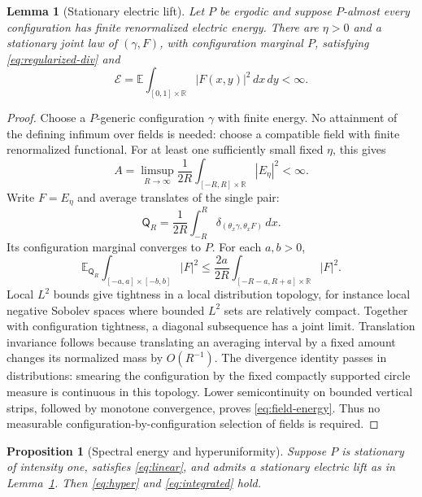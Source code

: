 \documentclass[11pt,reqno]{amsart}
\numberwithin{equation}{section}
\newtheorem{proposition}[theorem]{Proposition}
\newtheorem{lemma}[theorem]{Lemma}
\theoremstyle{definition}
\theoremstyle{remark}
\newcommand{\R}{\mathbb R}
\newcommand{\E}{\mathbb E}
\newcommand{\1}{\mathbf 1}
\newcommand{\dd}{\,d}
\newcommand{\calE}{\mathcal E}
\begin{document}
\begin{lemma}[Stationary electric lift]\label{lem:lift}
Let $P$ be ergodic and suppose $P$-almost every configuration has finite
renormalized electric energy. There are $\eta>0$ and a stationary
joint law of $(\gamma,F)$, with configuration marginal $P$, satisfying
\eqref{eq:regularized-div} and
\begin{equation}\label{eq:field-energy}
\calE=\E\int_{[0,1]\times\R}|F(x,y)|^2\dd x\dd y<\infty.
\end{equation}
\end{lemma}

\begin{proof}
Choose a $P$-generic configuration $\gamma$ with finite energy. No
attainment of the defining infimum over fields is needed: choose a
compatible field with finite renormalized functional. For at least
one sufficiently small fixed $\eta$, this gives
\[
A=\limsup_{R\to\infty}\frac1{2R}
\int_{[-R,R]\times\R}|E_\eta|^2<\infty.
\]
Write $F=E_\eta$ and average translates of the single pair:
\[
\mathsf Q_R=\frac1{2R}\int_{-R}^R
\delta_{(\theta_x\gamma,\theta_xF)}\dd x.
\]
Its configuration marginal converges to $P$. For each $a,b>0$,
\[
\E_{\mathsf Q_R}
\int_{[-a,a]\times[-b,b]}|F|^2
\le
\frac{2a}{2R}
\int_{[-R-a,R+a]\times\R}|F|^2.
\]
Local $L^2$ bounds give tightness in a local distribution topology,
for instance local negative Sobolev spaces where bounded $L^2$ sets
are relatively compact. Together with configuration tightness, a
diagonal subsequence has a joint limit. Translation invariance follows
because translating an averaging interval by a fixed amount changes
its normalized mass by $O(R^{-1})$. The divergence identity passes in
distributions: smearing the configuration by the fixed compactly
supported circle measure is continuous in this topology.
Lower semicontinuity on bounded vertical strips, followed by monotone
convergence, proves \eqref{eq:field-energy}. Thus no measurable
configuration-by-configuration selection of fields is required.
\end{proof}

\begin{proposition}[Spectral energy and hyperuniformity]
\label{prop:spectral}
Suppose $P$ is stationary of intensity one, satisfies
\eqref{eq:linear}, and admits a stationary electric lift as in
Lemma~\ref{lem:lift}. Then \eqref{eq:hyper} and
\eqref{eq:integrated} hold.
\end{proposition}
\end{document}
